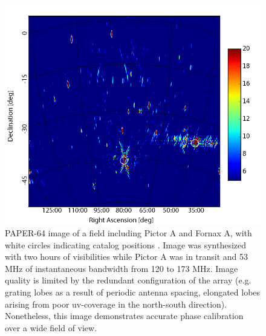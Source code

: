 \documentclass[twocolumn,numberedappendix]{emulateapj} \shorttitle{New Limits on the 21 cm Power Spectrum at $z=8.4$}
\begin{document}
\begin{figure}
\centering
\includegraphics[width=\columnwidth]{plots/picimg_cs.png}
\caption{
PAPER-64 image of a field including Pictor A and Fornax A, with white circles
indicating catalog positions \citep{jacobs_et_al2011}. Image was synthesized with two hours
of visibilities while Pictor A was in transit and 53 MHz of instantaneous
bandwidth from 120 to 173 MHz.  Image quality is limited by the redundant
configuration of the array (e.g. grating lobes as a result of periodic antenna
spacing, elongated lobes arising from poor uv-coverage in the north-south
direction).  Nonetheless, this image demonstrates accurate phase calibration
over a wide field of view.
} \label{fig:field_image}
\end{figure}
\end{document}
